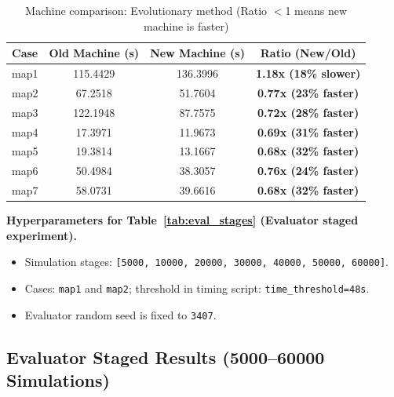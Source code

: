 \documentclass[onecolumn,a4paper,12pt]{IEEEtran}
\begin{document}
\begin{table}[h]
\centering
\caption{Machine comparison: Evolutionary method (Ratio $<$1 means new machine is faster)}
\label{tab:mach_evo}
\begin{tabular}{lccc}
\toprule
Case & Old Machine (s) & New Machine (s) & Ratio (New/Old) \\
\midrule
map1 & 115.4429 & 136.3996 & \textbf{1.18x (18\% slower)} \\
map2 & 67.2518 & 51.7604 & \textbf{0.77x (23\% faster)} \\
map3 & 122.1948 & 87.7575 & \textbf{0.72x (28\% faster)} \\
map4 & 17.3971 & 11.9673 & \textbf{0.69x (31\% faster)} \\
map5 & 19.3814 & 13.1667 & \textbf{0.68x (32\% faster)} \\
map6 & 50.4984 & 38.3057 & \textbf{0.76x (24\% faster)} \\
map7 & 58.0731 & 39.6616 & \textbf{0.68x (32\% faster)} \\
\bottomrule
\end{tabular}
\end{table}

\textbf{Hyperparameters for Table~\ref{tab:eval_stages} (Evaluator staged experiment).}
\begin{itemize}
        \item Simulation stages: \texttt{[5000, 10000, 20000, 30000, 40000, 50000, 60000]}.
        \item Cases: \texttt{map1} and \texttt{map2}; threshold in timing script: \texttt{time\_threshold=48s}.
        \item Evaluator random seed is fixed to \texttt{3407}.
\end{itemize}

\subsection{Evaluator Staged Results (5000--60000 Simulations)}
\end{document}
